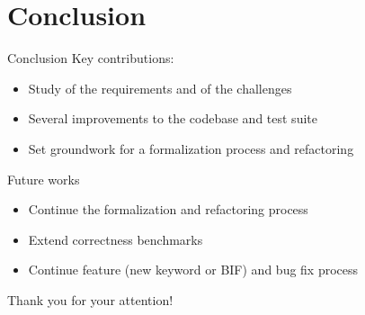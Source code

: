 \documentclass{beamer}
\begin{document}
\section{Conclusion}
\begin{frame}{Conclusion}
Key contributions:
\bigskip
\begin{itemize}
    \item Study of the requirements and of the challenges
    \bigskip
    \item Several improvements to the codebase and test suite
    \bigskip
    \item Set groundwork for a formalization process and refactoring
\end{itemize}

\end{frame}


\begin{frame}{Future works}
\begin{itemize}
    \item Continue the formalization and refactoring process
    \bigskip
    \item Extend correctness benchmarks
    \bigskip
    \item Continue feature (new keyword or BIF) and bug fix process
\end{itemize}
\end{frame}


\begin{frame}{}
\centering
Thank you for your attention!
\end{frame}
\end{document}
